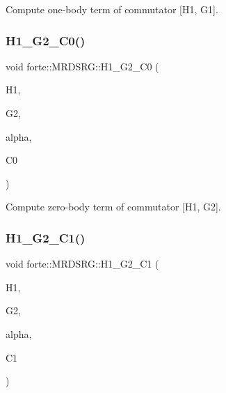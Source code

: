 Compute one-\/body term of commutator \mbox{[}H1, G1\mbox{]}. 

\mbox{\label{classforte_1_1_m_r_d_s_r_g_a3f7cbb7f7c2d637302a525967c303fd1}} 
\subsubsection{\texorpdfstring{H1\+\_\+\+G2\+\_\+\+C0()}{H1\_G2\_C0()}}
{\footnotesize\ttfamily void forte\+::\+M\+R\+D\+S\+R\+G\+::\+H1\+\_\+\+G2\+\_\+\+C0 (\begin{DoxyParamCaption}\item[{Blocked\+Tensor \&}]{H1,  }\item[{Blocked\+Tensor \&}]{G2,  }\item[{const double \&}]{alpha,  }\item[{double \&}]{C0 }\end{DoxyParamCaption})\hspace{0.3cm}{\ttfamily [protected]}}



Compute zero-\/body term of commutator \mbox{[}H1, G2\mbox{]}. 

\mbox{\label{classforte_1_1_m_r_d_s_r_g_af172aec7d3475d3ea52bf3682cd78c2d}} 
\subsubsection{\texorpdfstring{H1\+\_\+\+G2\+\_\+\+C1()}{H1\_G2\_C1()}}
{\footnotesize\ttfamily void forte\+::\+M\+R\+D\+S\+R\+G\+::\+H1\+\_\+\+G2\+\_\+\+C1 (\begin{DoxyParamCaption}\item[{Blocked\+Tensor \&}]{H1,  }\item[{Blocked\+Tensor \&}]{G2,  }\item[{const double \&}]{alpha,  }\item[{Blocked\+Tensor \&}]{C1 }\end{DoxyParamCaption})\hspace{0.3cm}{\ttfamily [protected]}}



